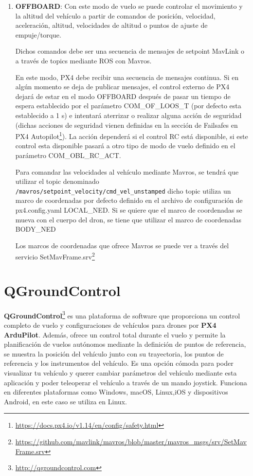 \begin{enumerate}
    \item \textbf{OFFBOARD}: Con este modo de vuelo se puede controlar el movimiento y la altitud del vehículo a partir de comandos de posición, velocidad, aceleración, altitud, velocidades de 
    altitud o puntos de ajuste de empuje/torque. 

    Dichos comandos debe ser una secuencia de mensajes de setpoint MavLink o a través de topics mediante ROS con Mavros.

    En este modo, PX4 debe recibir una secuencia de mensajes continua. Si en algún momento se deja de publicar mensajes, el control externo de PX4 dejará de estar en el modo OFFBOARD después
    de pasar un tiempo de espera establecido por el parámetro COM\_OF\_LOOS\_T (por defecto esta establecido a 1 s) e intentará aterrizar o realizar alguna acción de seguridad (dichas acciones 
    de seguridad vienen definidas en la sección de Failsafes en PX4 Autopilot\footnote{\url{https://docs.px4.io/v1.14/en/config/safety.html}}). La acción dependerá
    si el control RC está disponible, si este control esta disponible pasará a otro tipo de modo de vuelo definido en el parámetro COM\_OBL\_RC\_ACT. 

    Para comandar las velocidades al vehículo mediante Mavros, se tendrá que utilizar el topic denominado \texttt{/mavros/setpoint\_velocity/cmd\_vel\_unstamped} dicho topic utiliza un marco de coordenadas
    por defecto definido en el archivo de configuración de px4.config.yaml LOCAL\_NED. Si se quiere que el marco de coordenadas se mueva con el 
    cuerpo del dron, se tiene que utilizar el marco de coordenadas BODY\_NED
  
    Los marcos de coordenadas que ofrece Mavros se puede ver a través del servicio SetMavFrame.srv\footnote{\url{https://github.com/mavlink/mavros/blob/master/mavros_msgs/srv/SetMavFrame.srv}}
  \end{enumerate}
  
\section{QGroundControl}
\label{sec:QGroundControl} 

\textbf{QGroundControl}\footnote{\url{http://qgroundcontrol.com}} es una plataforma de software que proporciona un control completo de vuelo 
y configuraciones de vehículos para drones por \textbf{PX4 ArduPilot}. Además, ofrece un control total durante el vuelo y permite la planificación de vuelos autónomos 
mediante la definición de puntos de referencia, se muestra la posición del vehículo junto con su trayectoria, los puntos de referencia y los instrumentos del vehículo. 
Es una opción cómoda para poder visualizar tu vehículo y querer cambiar parámetros del vehículo mediante esta aplicación y poder teleoperar el vehículo a través de un mando joystick.
Funciona en diferentes plataformas como Windows, macOS, Linux,iOS y dispositivos Android, en este caso se utiliza en Linux. 


